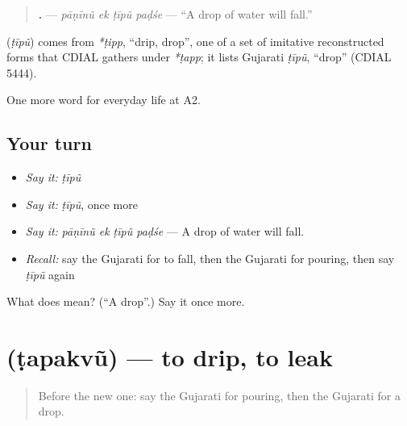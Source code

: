 \begin{quote}
\textbf{   .} — \emph{pāṇīnũ ek ṭīpũ paḍśe} — \textquotedblleft{}A drop of water will fall.\textquotedblright{}
\end{quote}

\begin{cousinweb}
\textbf{} (\emph{ṭīpũ}) comes from \emph{*ṭipp}, \textquotedblleft{}drip, drop\textquotedblright{}, one of a set of imitative reconstructed forms that CDIAL gathers under \emph{*ṭapp}; it lists Gujarati \emph{ṭīpũ}, \textquotedblleft{}drop\textquotedblright{} (CDIAL 5444).
\end{cousinweb}

\begin{grammarlens}[title={What you've built}]
One more word for everyday life at A2.
\end{grammarlens}

\subsection*{Your turn}
\begin{itemize}
\raggedright
  \item \emph{Say it:} \emph{ṭīpũ}
  \item \emph{Say it:} \emph{ṭīpũ}, once more
  \item \emph{Say it:} \emph{pāṇīnũ ek ṭīpũ paḍśe} — A drop of water will fall.
  \item \emph{Recall:} say the Gujarati for to fall, then the Gujarati for pouring, then say \emph{ṭīpũ} again
\end{itemize}

\begin{tcolorbox}[breakable,colback=teal!4,colframe=teal!35!black,title={Before you move on}]
What does  mean? (\textquotedblleft{}A drop\textquotedblright{}.) Say it once more.
\end{tcolorbox}
\section[\texorpdfstring{\gu{ટપકવું} (ṭapakvũ)}{ટપકવું (ṭapakvũ)}]{ (ṭapakvũ) — to drip, to leak}

\label{lesson:GU-C214-tapakvu}



\begin{quote}
Before the new one: say the Gujarati for pouring, then the Gujarati for a drop.
\end{quote}


